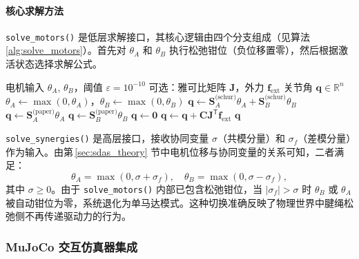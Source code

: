 \documentclass[12pt,a4paper]{report}
\newcommand{\R}{\mathbb{R}}
\begin{document}
\paragraph{核心求解方法}

\lstinline{solve_motors()} 是低层求解接口，其核心逻辑由四个分支组成（见算法\,\ref{alg:solve_motors}）。首先对 $\theta_A$ 和 $\theta_B$ 执行松弛钳位（负位移置零），然后根据激活状态选择求解公式。

\begin{algorithm}[htbp]
\caption{\lstinline{solve_motors()} 的约束选择逻辑}
\label{alg:solve_motors}
\begin{algorithmic}[1]
\Require 电机输入 $\theta_A$, $\theta_B$，阈值 $\varepsilon = 10^{-10}$
\Require 可选：雅可比矩阵 $\mathbf{J}$，外力 $\mathbf{f}_{\text{ext}}$
\Ensure 关节角 $\mathbf{q} \in \R^n$
\State $\theta_A \gets \max(0, \theta_A)$，$\theta_B \gets \max(0, \theta_B)$ 
    \State $\mathbf{q} \gets \mathbf{S}_A^{\text{(schur)}} \theta_A + \mathbf{S}_B^{\text{(schur)}} \theta_B$
    \State $\mathbf{q} \gets \mathbf{S}_A^{\text{(paper)}} \theta_A$
    \State $\mathbf{q} \gets \mathbf{S}_B^{\text{(paper)}} \theta_B$
\Else
    \State $\mathbf{q} \gets \mathbf{0}$
\EndIf
{}
    \State $\mathbf{q} \gets \mathbf{q} + \mathbf{C} \mathbf{J}^{\mathsf{T}} \mathbf{f}_{\text{ext}}$
\EndIf
\Return $\mathbf{q}$
\end{algorithmic}
\end{algorithm}

\lstinline{solve_synergies()} 是高层接口，接收协同变量 $\sigma$（共模分量）和 $\sigma_f$（差模分量）作为输入。由第\,\ref{sec:sdas_theory} 节中电机位移与协同变量的关系可知，二者满足：
\begin{equation}
    \theta_A = \max(0, \sigma + \sigma_f),\quad \theta_B = \max(0, \sigma - \sigma_f),
    \label{eq:sigma_to_theta}
\end{equation}
其中 $\sigma \ge 0$。由于 \lstinline{solve_motors()} 内部已包含松弛钳位，当 $|\sigma_f| > \sigma$ 时 $\theta_B$ 或 $\theta_A$ 被自动钳位为零，系统退化为单马达模式。这种切换准确反映了物理世界中腱绳松弛侧不再传递驱动力的行为。


\subsubsection{MuJoCo 交互仿真器集成}
\label{sec:mujoco_integration}
\end{document}
